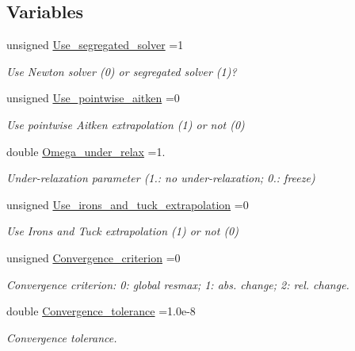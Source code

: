 \subsection*{Variables}
\begin{DoxyCompactItemize}
\item 
unsigned \hyperlink{namespaceFlags_a2cdfa6b776b959a060a1f2e8d4918789}{Use\+\_\+segregated\+\_\+solver} =1
\begin{DoxyCompactList}\small\item\em Use Newton solver (0) or segregated solver (1)? \end{DoxyCompactList}\item 
unsigned \hyperlink{namespaceFlags_aabfbfdb3e91e4df3fc2ec6e2a2e3567d}{Use\+\_\+pointwise\+\_\+aitken} =0
\begin{DoxyCompactList}\small\item\em Use pointwise Aitken extrapolation (1) or not (0) \end{DoxyCompactList}\item 
double \hyperlink{namespaceFlags_a6c3895aecba834ceda5fe1c3ecb13bba}{Omega\+\_\+under\+\_\+relax} =1.
\begin{DoxyCompactList}\small\item\em Under-\/relaxation parameter (1.\+: no under-\/relaxation; 0.\+: freeze) \end{DoxyCompactList}\item 
unsigned \hyperlink{namespaceFlags_a9d92a2ec6ebd4e2ea66605c063e53915}{Use\+\_\+irons\+\_\+and\+\_\+tuck\+\_\+extrapolation} =0
\begin{DoxyCompactList}\small\item\em Use Irons and Tuck extrapolation (1) or not (0) \end{DoxyCompactList}\item 
unsigned \hyperlink{namespaceFlags_aba930ff1e462e642a27904df95baab7c}{Convergence\+\_\+criterion} =0
\begin{DoxyCompactList}\small\item\em Convergence criterion\+: 0\+: global resmax; 1\+: abs. change; 2\+: rel. change. \end{DoxyCompactList}\item 
double \hyperlink{namespaceFlags_a5550ee43b27fd03898a6718246b44e4a}{Convergence\+\_\+tolerance} =1.\+0e-\/8
\begin{DoxyCompactList}\small\item\em Convergence tolerance. \end{DoxyCompactList}\item 

\end{DoxyCompactItemize}
